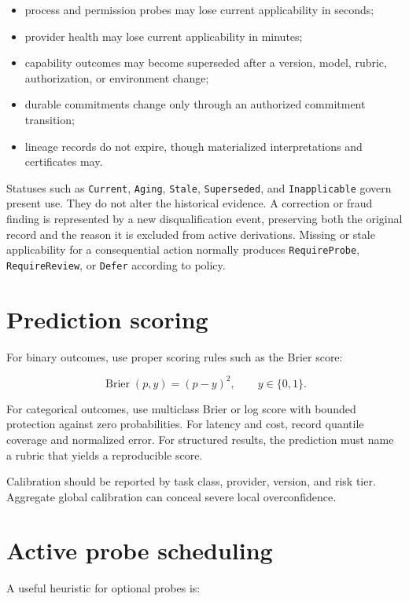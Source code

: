 \documentclass[11pt,oneside]{report}
\begin{document}
\begin{itemize}
  \item process and permission probes may lose current applicability in seconds;
  \item provider health may lose current applicability in minutes;
  \item capability outcomes may become superseded after a version, model, rubric, authorization, or environment change;
  \item durable commitments change only through an authorized commitment transition;
  \item lineage records do not expire, though materialized interpretations and certificates may.
\end{itemize}

Statuses such as \texttt{Current}, \texttt{Aging}, \texttt{Stale}, \texttt{Superseded}, and \texttt{Inapplicable} govern present use. They do not alter the historical evidence. A correction or fraud finding is represented by a new disqualification event, preserving both the original record and the reason it is excluded from active derivations. Missing or stale applicability for a consequential action normally produces \texttt{RequireProbe}, \texttt{RequireReview}, or \texttt{Defer} according to policy.

\section{Prediction scoring}

For binary outcomes, use proper scoring rules such as the Brier score:

\[
\operatorname{Brier}(p,y)=(p-y)^2,
\qquad y\in\{0,1\}.
\]

For categorical outcomes, use multiclass Brier or log score with bounded protection against zero probabilities. For latency and cost, record quantile coverage and normalized error. For structured results, the prediction must name a rubric that yields a reproducible score.

Calibration should be reported by task class, provider, version, and risk tier. Aggregate global calibration can conceal severe local overconfidence.

\section{Active probe scheduling}

A useful heuristic for optional probes is:
\end{document}

